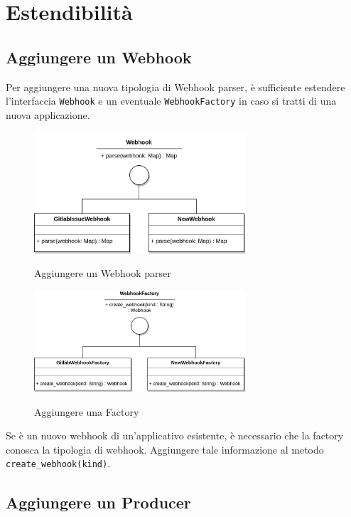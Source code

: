 \section{Estendibilità}\label{Estensibilita}

\subsection{Aggiungere un Webhook}

Per aggiungere una nuova tipologia di Webhook parser, è sufficiente estendere l'interfaccia \texttt{Webhook}
e un eventuale \texttt{WebhookFactory} in caso si tratti di una nuova applicazione.

\begin{figure}[H]
    \centering
    \includegraphics[width=0.7\textwidth]{img/EstensioneWebhook-Webhook.png}\\
    \caption{Aggiungere un Webhook parser}
\end{figure}


\begin{figure}[H]
    \centering
    \includegraphics[width=0.7\textwidth]{img/EstensioneWebhook-Factory.png}\\
    \caption{Aggiungere una Factory}
\end{figure}

Se è un nuovo webhook di un'applicativo esistente, è necessario che la factory conosca la tipologia di webhook.
Aggiungere tale informazione al metodo \texttt{create\_webhook(kind)}.


\subsection{Aggiungere un Producer}

